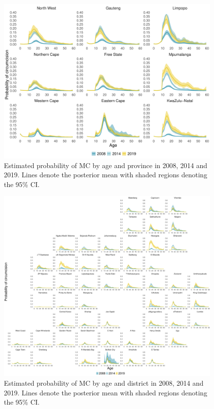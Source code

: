 \documentclass{article}
\begin{document}
\begin{appendix}

\begin{figure}[H]
	\centering
	\includegraphics[width = \linewidth]{Figures/suppmat/Rates/ProbabilityofMC_SingleAge_Province.pdf}
	\caption{Estimated probability of MC by age and province in 2008, 2014 and 2019. Lines denote the posterior mean with shaded regions denoting the 95\% CI.}
\end{figure}	


\begin{figure}[H]
	\centering
	\includegraphics[width = \linewidth]{Figures/suppmat/Rates/ProbabilityofMC_SingleAge_District.pdf}
	\caption{Estimated probability of MC by age and district in 2008, 2014 and 2019. Lines denote the posterior mean with shaded regions denoting the 95\% CI.}
\end{figure}


\end{appendix}
\end{document}
